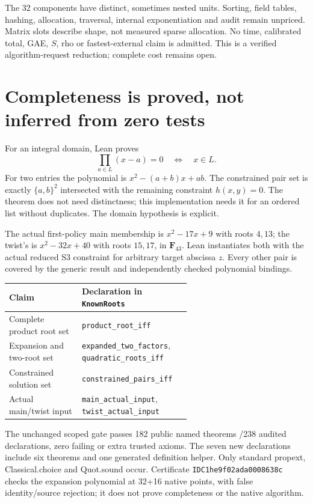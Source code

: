 \documentclass[10pt]{article}
\begin{document}
\noindent The 32 components have distinct, sometimes nested units. Sorting,
field tables, hashing, allocation, traversal, internal exponentiation and audit
remain unpriced. Matrix slots describe shape, not measured sparse allocation.
No time, calibrated total, GAE, $S$, rho or fastest-external claim is admitted.
This is a verified algorithm-request reduction; complete cost remains open.

\newpage
\section*{Completeness is proved, not inferred from zero tests}
For an integral domain, Lean proves
\[
  \prod_{a\in L}(x-a)=0\quad\Longleftrightarrow\quad x\in L.
\]
For two entries the polynomial is $x^2-(a+b)x+ab$. The constrained pair set is
exactly $\{a,b\}^2$ intersected with the remaining constraint $h(x,y)=0$.
The theorem does not need distinctness; this implementation needs it for an
ordered list without duplicates. The domain hypothesis is explicit.

The actual first-policy main membership is $x^2-17x+9$ with roots $4,13$;
the twist's is $x^2-32x+40$ with roots $15,17$, in $\mathbf F_{43}$. Lean
instantiates both with the actual reduced S3 constraint for arbitrary target
abscissa $z$. Every other pair is covered by the generic result and independently
checked polynomial bindings.

\begin{center}\begin{tabular}{lp{0.60\linewidth}}\toprule
Claim & Declaration in \texttt{KnownRoots}\\\midrule
Complete product root set & \texttt{product\_root\_iff}\\
Expansion and two-root set & \texttt{expanded\_two\_factors}, \texttt{quadratic\_roots\_iff}\\
Constrained solution set & \texttt{constrained\_pairs\_iff}\\
Actual main/twist input & \texttt{main\_actual\_input}, \texttt{twist\_actual\_input}\\\bottomrule
\end{tabular}\end{center}
The unchanged scoped gate passes 182 public named theorems /238 audited
declarations, zero failing or extra trusted axioms. The seven new declarations
include six theorems and one generated definition helper. Only standard
propext, Classical.choice and Quot.sound occur. Certificate
\texttt{IDC1he9f02ada0008638c} checks the expansion polynomial at 32+16 native
points, with false identity/source rejection; it does not prove completeness
or the native algorithm.
\end{document}
